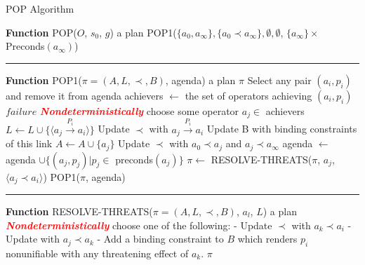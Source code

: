 \begin{algorithm}
  \caption{POP Algorithm}
  \label{alg:pop}
  \begin{algorithmic}
    \STATE \textbf{Function} POP($O$, $s_0$, $g$)
    \ENSURE a plan
    \RETURN POP1($\{a_0, a_{\infty}\}, \{a_0 \prec a_{\infty}\}, \emptyset, \emptyset$, $\{a_{\infty}\} \times$ Preconds$(a_{\infty})$)\\

    \STATE
    \hrule
    \STATE

    \STATE \textbf{Function} POP1($\pi = (A, L, \prec, B)$, agenda)
    \ENSURE a plan
    \RETURN $\pi$
    \ENDIF
    \STATE Select any pair $(a_i, p_i)$ and remove it from agenda
    \STATE achievers $\leftarrow$ the set of operators achieving $(a_i, p_i)$
    \RETURN $failure$
    \ENDIF
    \STATE \textcolor{red}{\textbf{\textit{Nondeterministically}}} choose some operator $a_j \in$ achievers
    \STATE $L \leftarrow L \cup \{\langle a_j \xrightarrow{\text{$P_i$}} a_i\rangle\}$
    \STATE Update $\prec$ with $a_j \xrightarrow{\text{$P_i$}} a_i$
    \STATE Update B with binding constraints of this link
    \STATE $A \leftarrow A \cup \{a_j\}$
    \STATE Update $\prec$ with $a_0 \prec a_j$ and $a_j \prec a_{\infty}$
    \STATE agenda $\leftarrow$ agenda $\cup \{(a_j, p_j)|p_j \in$ preconds$(a_j)\}$
    \ENDIF
    \STATE $\pi \leftarrow$ RESOLVE-THREATS($\pi$, $a_j$, $\langle a_j \prec a_i\rangle$)
    \RETURN POP1($\pi$, agenda)\\

    \STATE
    \hrule
    \STATE

    \STATE \textbf{Function} RESOLVE-THREATS($\pi = (A, L, \prec, B)$, $a_l$, $L$)
    \ENSURE a plan
    \STATE \textcolor{red}{\textbf{\textit{Nondeterministically}}} choose one of the following:
    \STATE - Update $\prec$ with $a_k \prec a_i$
    \STATE - Update with $a_j \prec a_k$
    \STATE - Add a binding constraint to $B$ which renders $p_i$ nonunifiable with any threatening effect of $a_k$.
    \ENDFOR
    \RETURN $\pi$
  \end{algorithmic}
\end{algorithm}